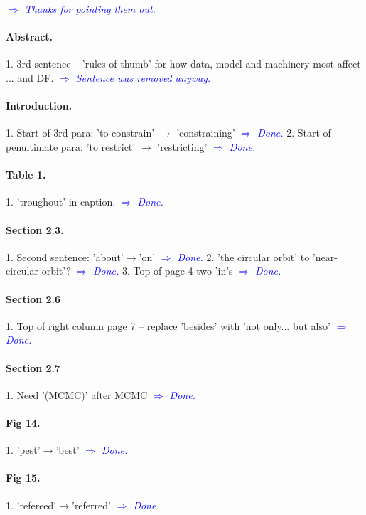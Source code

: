 \documentclass[10pt,a4paper]{article}
\newcommand{\Comment}[1]{\textsl{\textcolor{Blue}{$\Longrightarrow$ {#1}}}}
\begin{document}
 \Comment{Thanks for pointing them out.}

\paragraph{Abstract.} 1. 3rd sentence -- 'rules of thumb' for how data, model and machinery most affect ... and DF. \Comment{Sentence was removed anyway.}

\paragraph{Introduction.} 1. Start of 3rd para: 'to constrain' $\rightarrow$ 'constraining'  \Comment{Done.} 2. Start of penultimate para: 'to restrict' $\rightarrow$ 'restricting' \Comment{Done.}

\paragraph{Table 1.} 1. 'troughout' in caption. \Comment{Done.}

\paragraph{Section 2.3.} 1. Second sentence: 'about'$\rightarrow$'on' \Comment{Done.} 2. 'the circular orbit' to 'near-circular orbit'? \Comment{Done.} 3. Top of page 4 two 'in's \Comment{Done.}

\paragraph{Section 2.6} 1. Top of right column page 7 -- replace 'besides' with 'not only... but also' \Comment{Done.}

\paragraph{Section 2.7} 1. Need '(MCMC)' after MCMC \Comment{Done.}

\paragraph{Fig 14.} 1. 'pest'$\rightarrow$'best' \Comment{Done.}

\paragraph{Fig 15.} 1. 'refereed'$\rightarrow$'referred'  \Comment{Done.}
\end{document}
